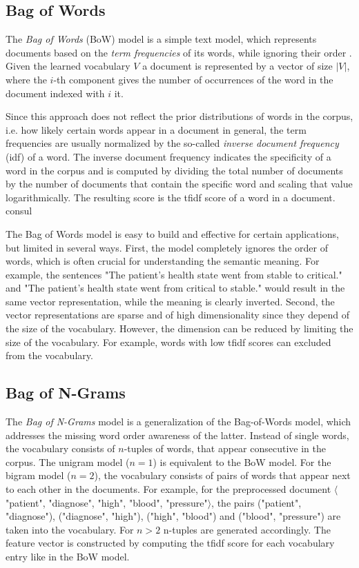 \subsection{Bag of Words}

The \textit{Bag of Words} (BoW) model is a simple text model, which represents documents based on the \textit{term frequencies} of its words, while ignoring their order \cite{harris1954distributional}.
Given the learned vocabulary $V$ a document is represented by a vector of size $|V|$, where the $i$-th component gives the number of occurrences of the word in the document indexed with $i$ it.

Since this approach does not reflect the prior distributions of words in the corpus, i.e. how likely certain words appear in a document in general, the term frequencies are usually normalized by the so-called \textit{inverse document frequency} (idf) of a word.
The inverse document frequency indicates the specificity of a word in the corpus and is computed by dividing the total number of documents by the number of documents that contain the specific word and scaling that value logarithmically.
The resulting score is the tfidf score of a word in a document.
 consul

The Bag of Words model is easy to build and effective for certain applications, but limited in several ways.
First, the model completely ignores the order of words, which is often crucial for understanding the semantic meaning. For example, the sentences "The patient's health state went from stable to critical." and "The patient's health state went from critical to stable." would result in the same vector representation, while the meaning is clearly inverted.
Second, the vector representations are sparse and of high dimensionality since they depend of the size of the vocabulary.
However, the dimension can be reduced by limiting the size of the vocabulary. For example, words with low tfidf scores can excluded from the vocabulary.


\subsection{Bag of N-Grams}

The \textit{Bag of N-Grams} model is a generalization of the Bag-of-Words model, which addresses the missing word order awareness of the latter.
Instead of single words, the vocabulary consists of $n$-tuples of words, that appear consecutive in the corpus.
The unigram model ($n=1$) is equivalent to the BoW model.
For the bigram model ($n=2$), the vocabulary consists of pairs of words that appear next to each other in the documents.
For example, for the preprocessed document $\langle$"patient", "diagnose", "high", "blood", "pressure"$\rangle$, the pairs ("patient", "diagnose"), ("diagnose", "high"), ("high", "blood") and ("blood", "pressure") are taken into the vocabulary.
For $n>2$ n-tuples are generated accordingly.
The feature vector is constructed by computing the tfidf score for each vocabulary entry like in the BoW model.

